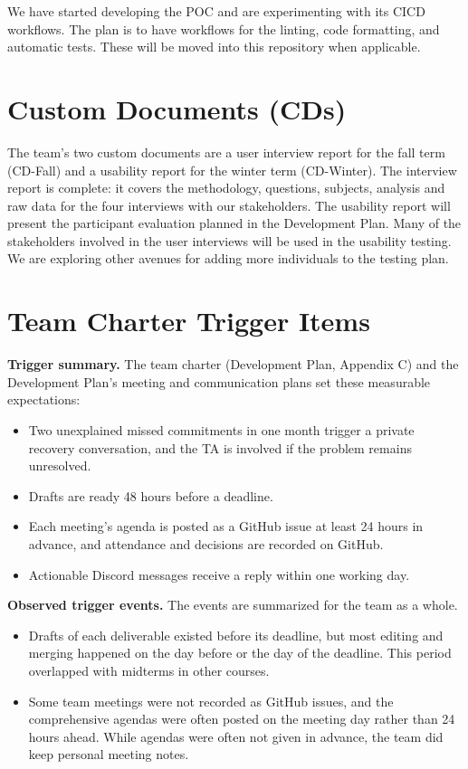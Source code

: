 \documentclass{article}
\begin{document}
We have started developing the POC and are experimenting with its CICD workflows. 
The plan is to have workflows for the linting, code formatting, and automatic tests.
These will be moved into this repository when applicable.

\section{Custom Documents (CDs)}

The team's two custom documents are a user interview report for the fall term
(CD-Fall) and a usability report for the winter term (CD-Winter). The interview
report is complete: it covers the methodology, questions, subjects, analysis and raw
data for the four interviews with our stakeholders. The usability
report will present the participant evaluation planned in the Development Plan.
Many of the stakeholders involved in the user interviews will be used in the usability testing.
We are exploring other avenues for adding more individuals to the testing plan.

\section{Team Charter Trigger Items}

\textbf{Trigger summary.} The team charter (Development Plan, Appendix C) and
the Development Plan's meeting and communication plans set these measurable
expectations:
\begin{itemize}
\item Two unexplained missed commitments in one month trigger a private recovery
conversation, and the TA is involved if the problem remains unresolved.
\item Drafts are ready 48 hours before a deadline.
\item Each meeting's agenda is posted as a GitHub issue at least 24 hours in
advance, and attendance and decisions are recorded on GitHub.
\item Actionable Discord messages receive a reply within one working day.
\end{itemize}

\textbf{Observed trigger events.} The events are summarized for the team as a
whole.
\begin{itemize}
\item Drafts of each deliverable existed before its deadline, but most editing
and merging happened on the day before or the day of the deadline. This period
overlapped with midterms in other courses.
\item Some team meetings were not recorded as GitHub issues, and the comprehensive agendas
were often posted on the meeting day rather
than 24 hours ahead. While agendas were often not given in advance,
the team did keep personal meeting notes.


\end{itemize}
\end{document}
